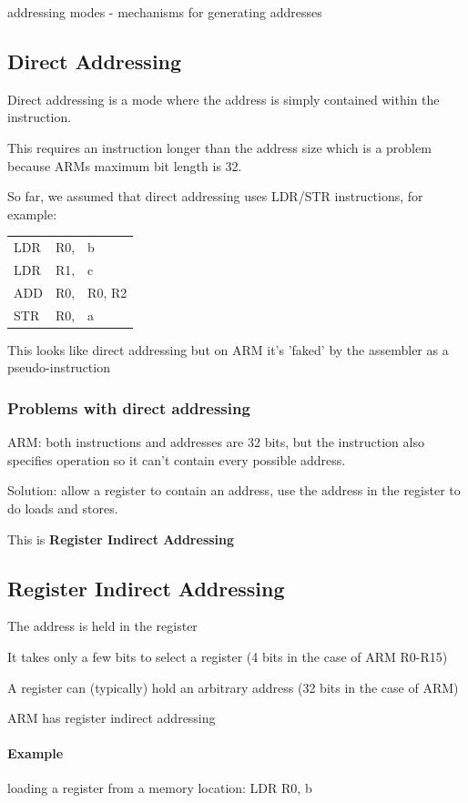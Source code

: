 \documentclass{article}
\begin{document}
addressing modes - mechanisms for generating addresses

\subsection{Direct Addressing}
Direct addressing is a mode where the address is simply contained within the instruction.

This requires an instruction longer than the address size which is a problem because ARMs maximum bit length is 32.

So far, we assumed that direct addressing uses LDR/STR instructions, for example:

\begin{center}
    \begin{tabular}{l l l}
        LDR & R0, & b\\
        LDR & R1, & c\\
        ADD & R0, & R0, R2\\
        STR & R0, & a \\
    \end{tabular}
\end{center}

This looks like direct addressing but on ARM it's 'faked' by the assembler as a pseudo-instruction

\subsubsection{Problems with direct addressing}
ARM: both instructions and addresses are 32 bits, but the instruction also specifies operation so it can't contain every possible address.

Solution: allow a register to contain an address, use the address in the register to do loads and stores.

This is {\bf Register Indirect Addressing}

\subsection{Register Indirect Addressing}
The address is held in the register

It takes only a few bits to select a register (4 bits in the case of ARM R0-R15)

A register can (typically) hold an arbitrary address (32 bits in the case of ARM)

ARM has register indirect addressing

\paragraph{Example}
loading a register from a memory location: LDR R0, b
\end{document}
